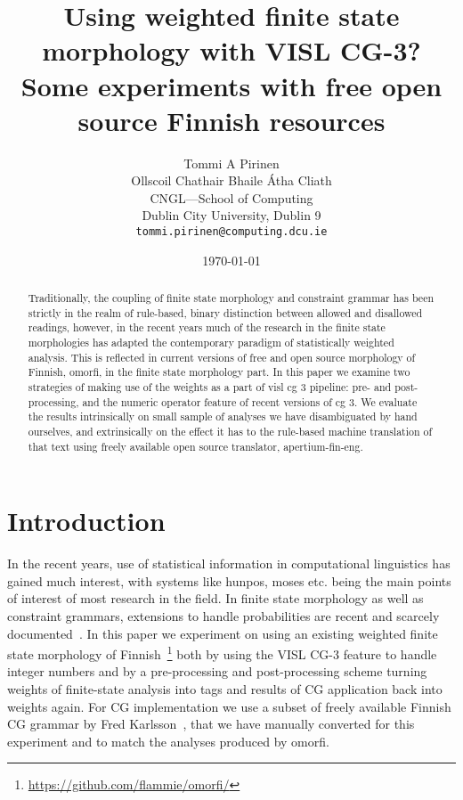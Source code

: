 \documentclass[11pt]{article}
\title{Using weighted finite state morphology with VISL CG-3? Some experiments
    with free open source Finnish resources}
\author{Tommi A Pirinen\\
Ollscoil Chathair Bhaile Átha Cliath\\
CNGL---School of Computing\\
Dublin City University, Dublin 9\\
{\tt tommi.pirinen@computing.dcu.ie}
}
\date{\today}
\begin{document}
\maketitle
\begin{abstract}
    Traditionally, the coupling of finite state morphology and constraint
    grammar has been strictly in the realm of rule-based, binary distinction
    between allowed and disallowed readings, however, in the recent years much
    of the research in the finite state morphologies has adapted the
    contemporary paradigm of statistically weighted analysis. This is reflected
    in current versions of free and open source morphology of Finnish, omorfi, in
    the finite state morphology part. In this paper we examine two strategies
    of making use of the weights as a part of visl cg 3 pipeline: pre- and
    post-processing, and the numeric operator feature of recent versions of cg
    3. We evaluate the results intrinsically on small sample of analyses we
    have disambiguated by hand ourselves, and extrinsically on the effect it
    has to the rule-based machine translation of that text using freely
    available open source translator, apertium-fin-eng. 
\end{abstract}

\section{Introduction}

In the recent years, use of statistical information in computational
linguistics has gained much interest, with systems like hunpos, moses etc.
being the main points of interest of most research in the field. In finite
state morphology as well as constraint grammars, extensions to handle
probabilities are recent and scarcely
documented~\cite{pirinen2009weighting,bick2009introducing}.  In this paper we
experiment on using an existing weighted finite state morphology of
Finnish~\cite{pirinen2011modularisation}\footnote{\url{https://github.com/flammie/omorfi/}}
both by using the VISL CG-3 feature to handle integer numbers and by a
pre-processing and post-processing scheme turning weights of finite-state
analysis into tags and results of CG application back into weights again. For
CG implementation we use a subset of freely available Finnish CG grammar by
Fred Karlsson~\cite{}, that we have manually converted for this experiment and
to match the analyses produced by omorfi.





\end{document}
